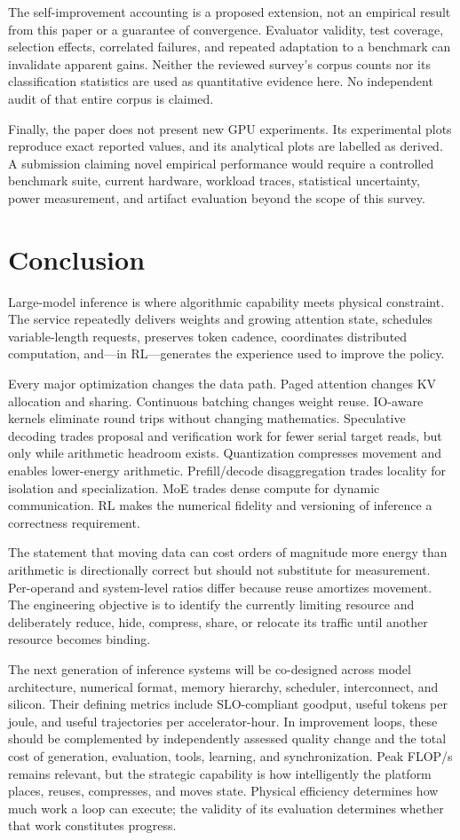 \documentclass[journal]{IEEEtran}
\begin{document}
The self-improvement accounting is a proposed extension, not an empirical result from this paper or a guarantee of convergence. Evaluator validity, test coverage, selection effects, correlated failures, and repeated adaptation to a benchmark can invalidate apparent gains. Neither the reviewed survey's corpus counts nor its classification statistics are used as quantitative evidence here. No independent audit of that entire corpus is claimed.

Finally, the paper does not present new GPU experiments. Its experimental plots reproduce exact reported values, and its analytical plots are labelled as derived. A submission claiming novel empirical performance would require a controlled benchmark suite, current hardware, workload traces, statistical uncertainty, power measurement, and artifact evaluation beyond the scope of this survey.

\section{Conclusion}
Large-model inference is where algorithmic capability meets physical constraint. The service repeatedly delivers weights and growing attention state, schedules variable-length requests, preserves token cadence, coordinates distributed computation, and---in RL---generates the experience used to improve the policy.

Every major optimization changes the data path. Paged attention changes KV allocation and sharing. Continuous batching changes weight reuse. IO-aware kernels eliminate round trips without changing mathematics. Speculative decoding trades proposal and verification work for fewer serial target reads, but only while arithmetic headroom exists. Quantization compresses movement and enables lower-energy arithmetic. Prefill/decode disaggregation trades locality for isolation and specialization. MoE trades dense compute for dynamic communication. RL makes the numerical fidelity and versioning of inference a correctness requirement.

The statement that moving data can cost orders of magnitude more energy than arithmetic is directionally correct but should not substitute for measurement. Per-operand and system-level ratios differ because reuse amortizes movement. The engineering objective is to identify the currently limiting resource and deliberately reduce, hide, compress, share, or relocate its traffic until another resource becomes binding.

The next generation of inference systems will be co-designed across model architecture, numerical format, memory hierarchy, scheduler, interconnect, and silicon. Their defining metrics include SLO-compliant goodput, useful tokens per joule, and useful trajectories per accelerator-hour. In improvement loops, these should be complemented by independently assessed quality change and the total cost of generation, evaluation, tools, learning, and synchronization. Peak FLOP/s remains relevant, but the strategic capability is how intelligently the platform places, reuses, compresses, and moves state. Physical efficiency determines how much work a loop can execute; the validity of its evaluation determines whether that work constitutes progress.
\end{document}
